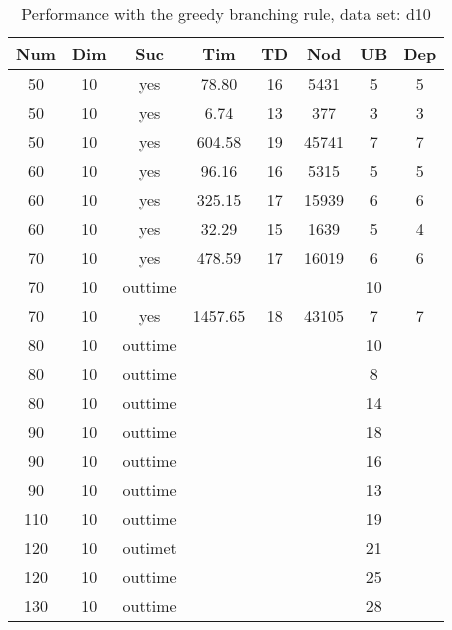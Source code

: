 \begin{table}[!htb]
  \centering
  \begin{tabular}[center]{|c|c|c|c|c|c|c|c|}
    \hline
    Num & Dim & Suc & Tim & TD & Nod & UB & Dep \\
    \hline
    50 & 10 & yes & 78.80 & 16 & 5431 & 5 & 5 \\
    50 & 10 & yes & 6.74 & 13 & 377 & 3 & 3 \\
    50 & 10 & yes & 604.58 & 19 & 45741 & 7 & 7 \\
    60 & 10 & yes & 96.16 & 16 & 5315 & 5 & 5 \\
    60 & 10 & yes & 325.15 & 17 & 15939 & 6 & 6 \\
    60 & 10 & yes & 32.29 & 15 & 1639 & 5 & 4 \\
    70 & 10 & yes & 478.59 & 17 & 16019 & 6 & 6 \\
    70 & 10 & outtime &&&& 10 &\\
    70 & 10 & yes & 1457.65 & 18 & 43105 & 7 & 7 \\
    80 & 10 & outtime &&&& 10 &\\
    80 & 10 & outtime &&&& 8 &\\
    80 & 10 & outtime &&&& 14 &\\
    90 & 10 & outtime &&&& 18 &\\
    90 & 10 & outtime &&&& 16 &\\
    90 & 10 & outtime &&&& 13 &\\
    110 & 10 & outtime &&&& 19 &\\
    120 & 10 & outimet &&&& 21 &\\
    120 & 10 & outtime &&&& 25 &\\
    130 & 10 & outtime &&&& 28 &\\
    \hline
  \end{tabular}
  \caption{Performance with the greedy branching rule, data set: d10}
  \label{tab:test.cutmds-d10}
\end{table}

